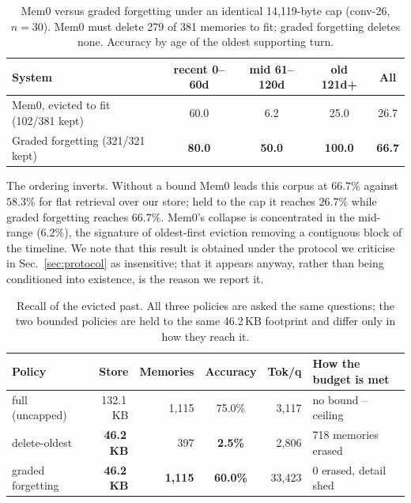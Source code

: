 \documentclass{article}
\theoremstyle{definition}\newtheorem{remark}{Remark}
\theoremstyle{plain}\newtheorem{proposition}{Proposition}
\begin{document}
\begin{table}[t]
\caption{Mem0 versus graded forgetting under an identical 14{,}119-byte cap
(conv-26, $n{=}30$). Mem0 must delete 279 of 381 memories to fit; graded
forgetting deletes none. Accuracy by age of the oldest supporting turn.}
\label{tab:mem0}\centering\small\setlength{\tabcolsep}{9pt}
\begin{tabular}{@{}lcccc@{}}
\toprule
\textbf{System} & \textbf{recent 0--60d} & \textbf{mid 61--120d} & \textbf{old 121d+} & \textbf{All} \\
\midrule
Mem0, evicted to fit (102/381 kept)  & 60.0 & \textcolor{bad}{6.2} & 25.0 & \textcolor{bad}{26.7} \\
\rowcolor{hl}
Graded forgetting (321/321 kept)     & \textbf{80.0} & \textbf{50.0} & \textbf{100.0} & \textbf{66.7} \\
\bottomrule
\end{tabular}
\end{table}

The ordering inverts. Without a bound Mem0 leads this corpus at $66.7\%$ against
$58.3\%$ for flat retrieval over our store; held to the cap it reaches $26.7\%$
while graded forgetting reaches $66.7\%$. Mem0's collapse is concentrated in the
mid-range ($6.2\%$), the signature of oldest-first eviction removing a
contiguous block of the timeline. We note that this result is obtained under the
protocol we criticise in Sec.~\ref{sec:protocol} as insensitive; that it appears
anyway, rather than being conditioned into existence, is the reason we report
it.

\begin{table}[t]
\caption{Recall of the evicted past. All three policies are asked the same
questions; the two bounded policies are held to the same 46.2\,KB footprint and
differ only in how they reach it.}
\label{tab:main}\centering\small\setlength{\tabcolsep}{7pt}
\begin{tabular}{@{}lrrcrl@{}}
\toprule
\textbf{Policy} & \textbf{Store} & \textbf{Memories} & \textbf{Accuracy} & \textbf{Tok/q} & \textbf{How the budget is met} \\
\midrule
full (uncapped)   & 132.1\,KB & 1,115 & 75.0\% & 3,117 & no bound -- ceiling \\
delete-oldest     & \textbf{46.2\,KB} & 397 & \textcolor{bad}{\textbf{2.5\%}} & 2,806 & 718 memories erased \\
\rowcolor{hl}
graded forgetting & \textbf{46.2\,KB} & \textbf{1,115} & \textbf{60.0\%} & 33,423 & 0 erased, detail shed \\
\bottomrule
\end{tabular}
\end{table}
\end{document}

